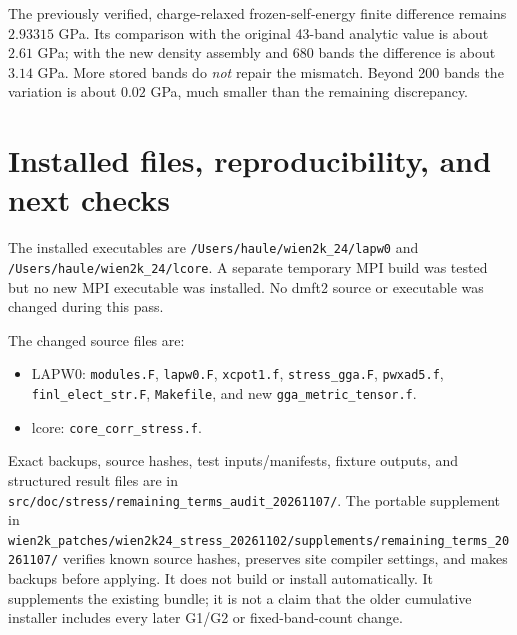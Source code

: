 \documentclass[11pt]{article}
\begin{document}
The previously verified, charge-relaxed frozen-self-energy finite difference remains $2.93315$ GPa. Its comparison with the original 43-band analytic value is about $2.61$ GPa; with the new density assembly and 680 bands the difference is about $3.14$ GPa. More stored bands do \emph{not} repair the mismatch. Beyond 200 bands the variation is about $0.02$ GPa, much smaller than the remaining discrepancy.

\section{Installed files, reproducibility, and next checks}
The installed executables are \nolinkurl{/Users/haule/wien2k_24/lapw0} and \nolinkurl{/Users/haule/wien2k_24/lcore}. A separate temporary MPI build was tested but no new MPI executable was installed. No dmft2 source or executable was changed during this pass.

The changed source files are:
\begin{itemize}
\item LAPW0: \texttt{modules.F}, \texttt{lapw0.F}, \texttt{xcpot1.f}, \texttt{stress\_gga.F}, \texttt{pwxad5.f}, \texttt{finl\_elect\_str.F}, \texttt{Makefile}, and new \texttt{gga\_metric\_tensor.f}.
\item lcore: \texttt{core\_corr\_stress.f}.
\end{itemize}
Exact backups, source hashes, test inputs/manifests, fixture outputs, and structured result files are in \nolinkurl{src/doc/stress/remaining_terms_audit_20261107/}. The portable supplement in \nolinkurl{wien2k_patches/wien2k24_stress_20261102/supplements/remaining_terms_20261107/} verifies known source hashes, preserves site compiler settings, and makes backups before applying. It does not build or install automatically. It supplements the existing bundle; it is not a claim that the older cumulative installer includes every later G1/G2 or fixed-band-count change.
\end{document}
